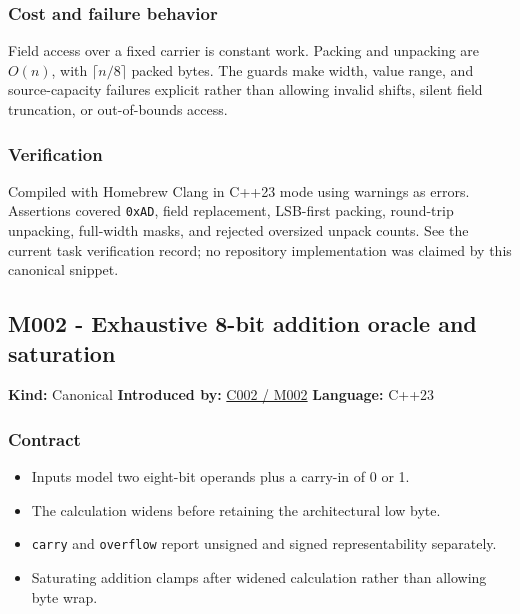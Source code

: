 \subsubsection{Cost and failure behavior}\label{appendix-4e2236f53445-cost-and-failure-behavior}

\hypertarget{appendix-4e2236f53445-cost-and-failure-behavior}{}

Field access over a fixed carrier is constant work. Packing and unpacking are \(O(n)\), with \(\lceil n/8\rceil\) packed bytes. The guards make width, value range, and source-capacity failures explicit rather than allowing invalid shifts, silent field truncation, or out-of-bounds access.

\subsubsection{Verification}\label{appendix-4e2236f53445-verification}

\hypertarget{appendix-4e2236f53445-verification}{}

Compiled with Homebrew Clang in C++23 mode using warnings as errors. Assertions covered \texttt{0xAD}, field replacement, LSB-first packing, round-trip unpacking, full-width masks, and rejected oversized unpack counts. See the current task verification record; no repository implementation was claimed by this canonical snippet.

\subsection{M002 - Exhaustive 8-bit addition oracle and saturation}\label{appendix-4e2236f53445-m002---exhaustive-8-bit-addition-oracle-and-saturation}

\hypertarget{appendix-4e2236f53445-m002---exhaustive-8-bit-addition-oracle-and-saturation}{}

\textbf{Kind:} Canonical \textbf{Introduced by:} \hyperref[01-foundations-i-ch001-arithmetic-becomes-a-policy]{C002 / M002} \textbf{Language:} C++23

\subsubsection{Contract}\label{appendix-4e2236f53445-contract-1}

\hypertarget{appendix-4e2236f53445-contract-1}{}

\begin{itemize}
\tightlist
\item
  Inputs model two eight-bit operands plus a carry-in of 0 or 1.
\item
  The calculation widens before retaining the architectural low byte.
\item
  \texttt{carry} and \texttt{overflow} report unsigned and signed representability separately.
\item
  Saturating addition clamps after widened calculation rather than allowing byte wrap.
\end{itemize}

